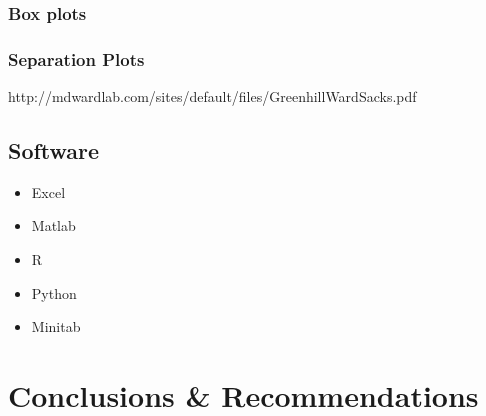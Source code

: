 \documentclass[11pt,a4paper,article]{memoir} %
\begin{document}
\subsection{Box plots}
\subsection{Separation Plots}
http://mdwardlab.com/sites/default/files/GreenhillWardSacks.pdf

\section{Software}
\begin{itemize}
\item Excel
\item Matlab
\item R
\item Python
\item Minitab
\end{itemize}

\newpage


\chapter{Conclusions \& Recommendations}

\newpage
\appendix
\end{document}
